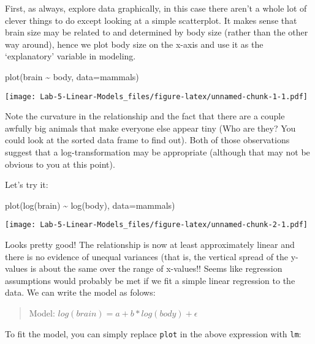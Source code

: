 \documentclass[
]{article}
\newenvironment{Shaded}{\begin{snugshade}}{\end{snugshade}}
\newcommand{\AttributeTok}[1]{\textcolor[rgb]{0.77,0.63,0.00}{#1}}
\newcommand{\FunctionTok}[1]{\textcolor[rgb]{0.00,0.00,0.00}{#1}}
\newcommand{\NormalTok}[1]{#1}
\newcommand{\SpecialCharTok}[1]{\textcolor[rgb]{0.00,0.00,0.00}{#1}}
\begin{document}
First, as always, explore data graphically, in this case there aren't a
whole lot of clever things to do except looking at a simple scatterplot.
It makes sense that brain size may be related to and determined by body
size (rather than the other way around), hence we plot body size on the
x-axis and use it as the `explanatory' variable in modeling.

\begin{Shaded}
\begin{Highlighting}[]
\FunctionTok{plot}\NormalTok{(brain }\SpecialCharTok{\textasciitilde{}}\NormalTok{ body, }\AttributeTok{data=}\NormalTok{mammals)}
\end{Highlighting}
\end{Shaded}

\texttt{[image: Lab-5-Linear-Models\_files/figure-latex/unnamed-chunk-1-1.pdf]}

Note the curvature in the relationship and the fact that there are a
couple awfully big animals that make everyone else appear tiny (Who are
they? You could look at the sorted data frame to find out). Both of
those observations suggest that a log-transformation may be appropriate
(although that may not be obvious to you at this point).

Let's try it:

\begin{Shaded}
\begin{Highlighting}[]
\FunctionTok{plot}\NormalTok{(}\FunctionTok{log}\NormalTok{(brain) }\SpecialCharTok{\textasciitilde{}} \FunctionTok{log}\NormalTok{(body), }\AttributeTok{data=}\NormalTok{mammals)}
\end{Highlighting}
\end{Shaded}

\texttt{[image: Lab-5-Linear-Models\_files/figure-latex/unnamed-chunk-2-1.pdf]}

Looks pretty good! The relationship is now at least approximately linear
and there is no evidence of unequal variances (that is, the vertical
spread of the y-values is about the same over the range of x-values!!
Seems like regression assumptions would probably be met if we fit a
simple linear regression to the data. We can write the model as folows:

\begin{quote}
Model: \(log(brain) = a + b * log(body) + \epsilon\)
\end{quote}

To fit the model, you can simply replace \texttt{plot} in the above
expression with \texttt{lm}:
\end{document}
